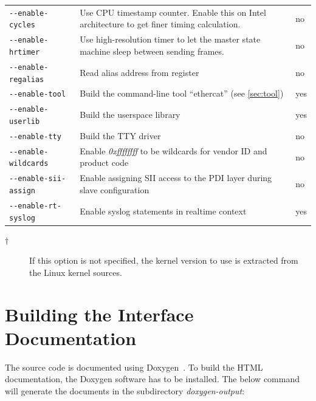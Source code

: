 \documentclass[a4paper,12pt,BCOR=6mm,bibtotoc,idxtotoc]{scrbook}
\begin{document}
\begin{longtable}{l|p{}|l}
\lstinline+--enable-cycles+ & Use CPU timestamp counter. Enable this on Intel
architecture to get finer timing calculation. & no\\

\lstinline+--enable-hrtimer+ & Use high-resolution timer to let the master
state machine sleep between sending frames. & no\\

\lstinline+--enable-regalias+ & Read alias address from register & no\\

\lstinline+--enable-tool+ & Build the command-line tool ``ethercat'' (see
\autoref{sec:tool}) & yes\\

\lstinline+--enable-userlib+ & Build the userspace library & yes\\

\lstinline+--enable-tty+ & Build the TTY driver & no\\

\lstinline+--enable-wildcards+ & Enable \textit{0xffffffff} to be wildcards
for vendor ID and product code & no\\

\lstinline+--enable-sii-assign+ & Enable assigning SII access to the PDI layer
during slave configuration & no\\

\lstinline+--enable-rt-syslog+ & Enable syslog statements in realtime context &
yes\\

\hline

\end{longtable}

\begin{description}

\item[$\dagger$] If this option is not specified, the kernel version to use is
extracted from the Linux kernel sources.

\end{description}

\section{Building the Interface Documentation}
\label{sec:gendoc}

The source code is documented using Doxygen~\cite{doxygen}. To build the HTML
documentation, the Doxygen software has to be installed. The below command
will generate the documents in the subdirectory \textit{doxygen-output}:
\end{document}
